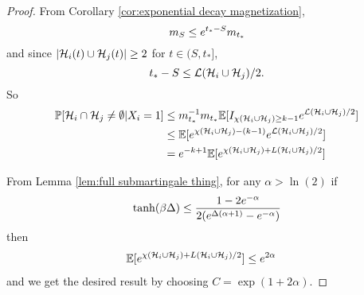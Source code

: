 \begin{proof}
		From Corollary \ref{cor:exponential decay magnetization}, 
		\begin{equation}
			m_S \leq e^{t_* - S} m_{t_*}
		\end{equation}
		and since $|\mathcal{H}_i(t) \cup \mathcal{H}_j(t)| \geq 2$ for $t \in (S, t_*]$,
		\begin{equation}
			t_* - S \leq \mathcal{L}(\mathcal{H}_i \cup \mathcal{H}_j)/2.
		\end{equation}
		So
		\begin{align}
			\prob[\mathcal{H}_i \cap \mathcal{H}_j \neq \emptyset | X_i = 1] %
			&\leq m_{t_*}^{-1} m_{t_*} \expect[\indicator_{\chi(\hist_i \cup \hist_j) \geq k-1} \euler^{\mathcal{L}(\hist_i\cup \hist_j)/2}]\\
			&\leq \expect[\euler^{\chi(\hist_i\cup \hist_j) - (k-1)} \euler^{\mathcal{L}(\hist_i\cup \hist_j)/2}]\\
			&= \euler^{-k + 1} \expect[\euler^{\chi(\hist_i\cup \hist_j) + L(\hist_i\cup \hist_j)/2} ]
		\end{align}

		From Lemma \ref{lem:full submartingale thing}, for any $\alpha > \ln(2)$ if
		\begin{equation}
			\tanh(\beta\Delta) \leq \frac{1-2e^{-\alpha}}{2(e^{\Delta(\alpha+1)} - e^{-\alpha})}
		\end{equation}
		then
		\begin{align}
			\mathbb{E}[e^{\chi(\mathcal{H}_i\cup \mathcal{H}_j) + L(\mathcal{H}_i\cup \mathcal{H}_j)/2} ] &\leq e^{2\alpha}
		\end{align}
		and we get the desired result by choosing $C = \exp(1 + 2\alpha)$.
	\end{proof}